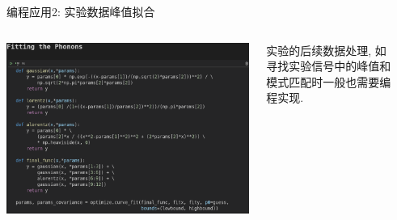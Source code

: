 \documentclass{beamer}
\begin{document}
    \begin{frame}{编程应用2: 实验数据峰值拟合}
      \begin{columns}
        \begin{column}{0.85\textwidth}
          \centering
          \begin{tcolorbox}[beamer,width=0.88\textwidth,arc=0pt,boxsep=0pt,left=0pt,right=0pt,top=0pt,bottom=0pt]
            \includegraphics[width=\textwidth]{figure/curv-fitting.png}
          \end{tcolorbox}
        \end{column}
        \begin{column}{0.16\textwidth}
          \centering
          \begin{block}{}
            实验的后续数据处理, 如寻找实验信号中的峰值和模式匹配时一般也需要编程实现.
          \end{block}
        \end{column}
        \begin{column}{0.1\textwidth}
        \end{column}
      \end{columns}
    \end{frame}
\end{document}
